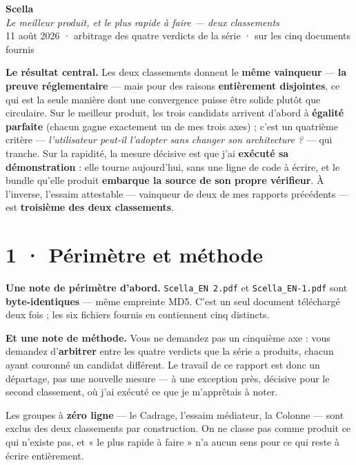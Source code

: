 \documentclass[10pt]{article}
\newcommand{\code}[1]{\texttt{\small #1}}
\begin{document}
\begin{center}
{\Huge\bfseries\color{navy} Scella}\\[4pt]
{\large\color{grey}\itshape Le meilleur produit, et le plus rapide à faire --- deux classements}\\[4pt]
{\small\color{grey} 11 août 2026 \; · \; arbitrage des quatre verdicts de la série \; · \; sur les cinq documents fournis}
\end{center}
\vspace{2pt}

\begin{these}
\textbf{Le résultat central.} Les deux classements donnent le \textbf{même vainqueur} --- \textbf{la
preuve réglementaire} --- mais pour des raisons \textbf{entièrement disjointes}, ce qui est la seule
manière dont une convergence puisse être solide plutôt que circulaire. Sur le meilleur produit, les
trois candidats arrivent d'abord à \textbf{égalité parfaite} (chacun gagne exactement un de mes trois
axes) ; c'est un quatrième critère --- \emph{l'utilisateur peut-il l'adopter sans changer son
architecture ?} --- qui tranche. Sur la rapidité, la mesure décisive est que j'ai
\textbf{exécuté sa démonstration} : elle tourne aujourd'hui, sans une ligne de code à écrire, et le
bundle qu'elle produit \textbf{embarque la source de son propre vérifieur}. À l'inverse, l'essaim
attestable --- vainqueur de deux de mes rapports précédents --- est \textbf{troisième des deux
classements}.
\end{these}

\section{1 · Périmètre et méthode}

\textbf{Une note de périmètre d'abord.} \code{Scella\_EN 2.pdf} et \code{Scella\_EN-1.pdf} sont
\textbf{byte-identiques} --- même empreinte MD5. C'est un seul document téléchargé deux fois ; les six
fichiers fournis en contiennent cinq distincts.

\textbf{Et une note de méthode.} Vous ne demandez pas un cinquième axe : vous demandez d'\textbf{arbitrer}
entre les quatre verdicts que la série a produits, chacun ayant couronné un candidat différent. Le
travail de ce rapport est donc un départage, pas une nouvelle mesure --- à une exception près, décisive
pour le second classement, où j'ai exécuté ce que je m'apprêtais à noter.

Les groupes à \textbf{zéro ligne} --- le Cadrage, l'essaim médiateur, la Colonne --- sont exclus des deux
classements par construction. On ne classe pas comme produit ce qui n'existe pas, et « le plus rapide à
faire » n'a aucun sens pour ce qui reste à écrire entièrement.
\end{document}
